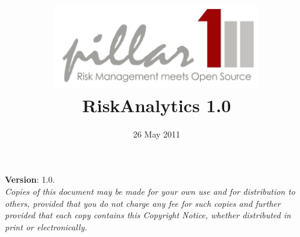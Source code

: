 

\begin{titlepage}
%
\title{\includegraphics[width=9cm]{images/pillarone-logo-simple-small.jpg}\\[2cm]
%
{\Huge \textsf{RiskAnalytics 1.0}}\\[1cm]}
\author{}%
\date{26 May 2011}%
\maketitle

\begin{flushleft}
{\small{
{\bfseries Version}: 1.0.\pageref{LastPage}\\[1cm]

\emph{Copies of this document may be made for your own use and for distribution to others, provided that you do not charge any fee for such copies and further provided that each copy contains this Copyright Notice, whether distributed in print or electronically.}\\[1cm]

}}
\end{flushleft}
\end{titlepage}
